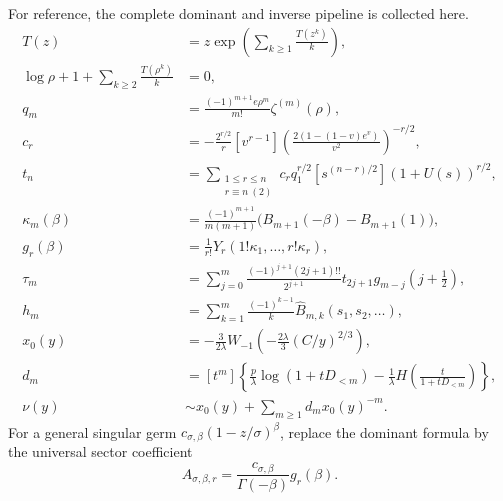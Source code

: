 \documentclass[11pt,oneside]{article}
\numberwithin{equation}{section}
\theoremstyle{plain}
\theoremstyle{definition}
\theoremstyle{remark}
\newcommand{\Bhat}{\widehat{B}}
\begin{document}
For reference, the complete dominant and inverse pipeline is collected here.
\begin{align*}
 T(z)&=z\exp\!\left(\sum_{k\ge1}\frac{T(z^k)}k\right),\\
 \log\rho+1+\sum_{k\ge2}\frac{T(\rho^k)}k&=0,\\
 q_m&=\frac{(-1)^{m+1}e\rho^m}{m!}\zeta^{(m)}(\rho),\\
 c_r&=-\frac{2^{r/2}}r[v^{r-1}]
 \left(\frac{2(1-(1-v)e^v)}{v^2}\right)^{-r/2},\\
 t_n&=\sum_{\substack{1\le r\le n\\r\equiv n\ (2)}}
 c_rq_1^{r/2}[s^{(n-r)/2}](1+U(s))^{r/2},\\
 \kappa_m(\beta)&=\frac{(-1)^{m+1}}{m(m+1)}
 \bigl(B_{m+1}(-\beta)-B_{m+1}(1)\bigr),\\
 g_r(\beta)&=\frac1{r!}Y_r(1!\kappa_1,\ldots,r!\kappa_r),\\
 \tau_m&=\sum_{j=0}^{m}
 \frac{(-1)^{j+1}(2j+1)!!}{2^{j+1}}
 t_{2j+1}g_{m-j}(j+\tfrac12),\\
 h_m&=\sum_{k=1}^{m}\frac{(-1)^{k-1}}k
 \Bhat_{m,k}(s_1,s_2,\ldots),\\
 x_0(y)&=-\frac{3}{2\lambda}W_{-1}\!\left(
 -\frac{2\lambda}{3}(C/y)^{2/3}\right),\\
 d_m&=[t^m]\left\{\frac p\lambda\log(1+tD_{<m})
 -\frac1\lambda H\!\left(\frac{t}{1+tD_{<m}}\right)\right\},\\
 \nu(y)&\sim x_0(y)+\sum_{m\ge1}d_mx_0(y)^{-m}.
\end{align*}
For a general singular germ $c_{\sigma,\beta}(1-z/\sigma)^\beta$,
replace the dominant formula by the universal sector coefficient
\[
 A_{\sigma,\beta,r}=
 \frac{c_{\sigma,\beta}}{\Gamma(-\beta)}g_r(\beta).
\]
\end{document}
